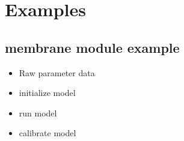 \documentclass[letterpaper,10pt,english]{sphinxmanual}
\begin{document}
\begin{fulllineitems}
\begin{fulllineitems}
\label{\detokenize{test_helper_func:test_helper_func.TestHelperFunc.test_find_similar_group}}
\end{fulllineitems}


\begin{fulllineitems}
\label{\detokenize{test_helper_func:test_helper_func.TestHelperFunc.test_interp_extrap_f}}
\end{fulllineitems}


\begin{fulllineitems}
\label{\detokenize{test_helper_func:test_helper_func.TestHelperFunc.test_sample_integral}}
\end{fulllineitems}


\end{fulllineitems}



\chapter{Examples}
\label{\detokenize{examples:examples}}\label{\detokenize{examples::doc}}

\section{membrane module example}
\label{\detokenize{membrane_example:membrane-module-example}}\label{\detokenize{membrane_example::doc}}\begin{itemize}
\item {} 
\sphinxAtStartPar
Raw parameter data

\item {} 
\sphinxAtStartPar
initialize model

\item {} 
\sphinxAtStartPar
run model

\item {} 
\sphinxAtStartPar
calibrate model

\end{itemize}
\end{document}
